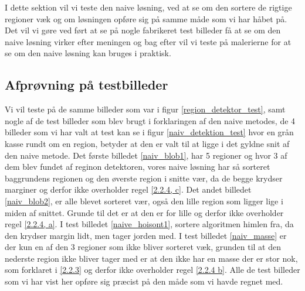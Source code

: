 {\sffamily
I dette sektion vil vi teste den naive løsning, ved at se om den sortere
de rigtige regioner væk og om løsningen opføre sig på samme måde som vi
har håbet på. Det vil vi gøre ved ført at se på nogle fabrikeret test
billeder få at se om den naive løsning virker efter meningen og bag
efter vil vi teste på malerierne for at se om den naive løsning kan
bruges i praktisk.
}
  
\subsection{Afprøvning på testbilleder}
Vi vil teste på de samme billeder som var i figur
\ref{region_detektor_test}, samt nogle af de test billeder som blev
brugt i forklaringen af den naive metodes, de 4 billeder som vi har valt
at test kan se i figur \ref{naiv_detektion_test} hvor en grån kasse
rundt om en region, betyder at den er valt til at ligge i det gyldne
snit af den naive metode. Det første billedet \ref{naiv_blob1}, har 5
regioner og hvor 3 af dem blev fundet af reginon detektoren, vores naive
løsning har så sorteret baggrundens regionen og den øverste region i
snitte vær, da de begge krydser marginer og derfor ikke overholder regel
\ref{2.2.4, c}. Det andet billedet \ref{naiv_blob2}, er alle blevet
sorteret vær, også den lille region som ligger lige i miden af snittet.
Grunde til det er at den er for lille og derfor ikke overholder regel
\ref{2.2.4, a}. I test billedet \ref{naive_hoisont1}, sortere algoritmen
himlen fra, da den krydser margin lidt, men tager jorden med. I test
billedet \ref{naiv_masse} er der kun en af den 3 regioner som ikke
bliver sorteret væk, grunden til at den nederste region ikke bliver
tager med er at den ikke har en masse der er stor nok, som forklaret i
\ref{2.2.3} og derfor ikke overholder regel \ref{2.2.4 b}. Alle de test
billeder som vi har vist her opføre sig præcist på den måde som vi havde
regnet med.

